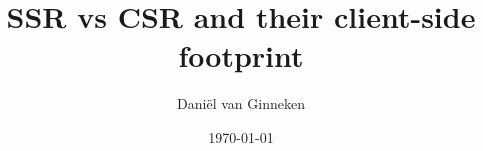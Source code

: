\documentclass[12pt,english]{avans}
\title{SSR vs CSR and their client-side footprint}
\author{Dani\"el van Ginneken}
\date{\today}
\begin{document}

\tableofcontents
\clearpage










\nocite{*}


\end{document}
